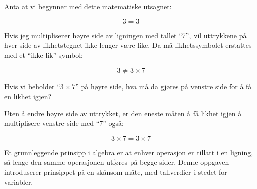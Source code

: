 

Anta at vi begynner med dette matematiske utsagnet:

$$3 = 3$$

Hvis jeg multipliserer høyre side av ligningen med tallet ``7'', vil uttrykkene på hver side av likhetstegnet ikke lenger være like. Da må likhetssymbolet erstattes med et ``ikke lik''-symbol:

$$3 \not = 3 \times 7$$ 

Hvis vi beholder ``$3 \times 7$'' på høyre side, hva må da gjøres på venstre side for å få en likhet igjen?







Uten å endre høyre side av uttrykket, er den eneste måten å få likhet igjen å multiplisere venstre side med ``7'' også:

$$3 \times 7 = 3 \times 7$$ 







Et grunnleggende prinsipp i algebra er at enhver operasjon er tillatt i en ligning, så lenge den samme operasjonen utføres på begge sider. Denne oppgaven introduserer prinsippet på en skånsom måte, med tallverdier i stedet for variabler.


